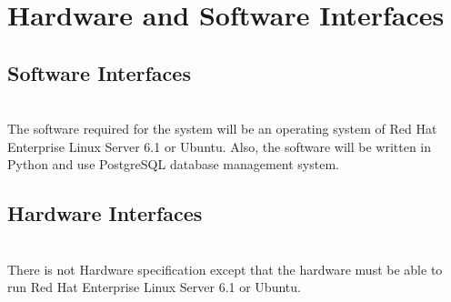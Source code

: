 \section{Hardware and Software Interfaces}
\subsection{Software Interfaces}\\
The software required for the system will be an operating system of Red Hat Enterprise Linux Server 6.1 or Ubuntu.  Also, the software will be written in Python and use PostgreSQL database management system.

\subsection{Hardware Interfaces}\\
There is not Hardware specification except that the hardware must be able to run Red Hat Enterprise Linux Server 6.1 or Ubuntu.